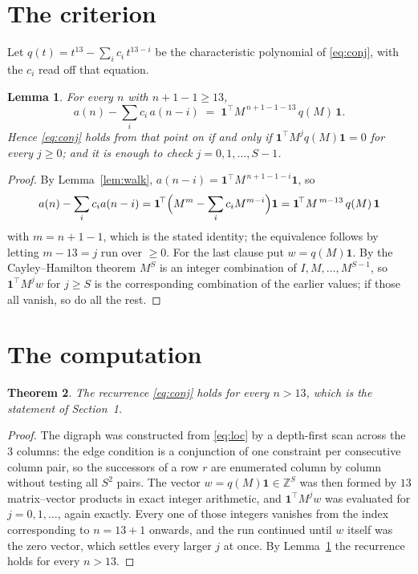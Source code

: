 \documentclass[11pt,a4paper]{article}
\theoremstyle{plain}
\newtheorem{theorem}{Theorem}
\newtheorem{lemma}[theorem]{Lemma}
\theoremstyle{definition}
\begin{document}
\section{The criterion}

Let $q(t)=t^{13}-\sum_i c_i\,t^{13-i}$ be the characteristic polynomial of
\eqref{eq:conj}, with the $c_i$ read off that equation.

\begin{lemma}\label{lem:crit}
For every $n$ with $n+1-1\ge13$,
\[
a(n)-\sum_i c_i\,a(n-i)\;=\;\mathbf{1}^{\!\top}M^{\,n+1-1-13}\,q(M)\,\mathbf{1} .
\]
Hence \eqref{eq:conj} holds from that point on if and only if
$\mathbf{1}^{\!\top}M^{j}q(M)\mathbf{1}=0$ for every $j\ge0$; and it is enough to check
$j=0,1,\dots,S-1$.
\end{lemma}

\begin{proof}
By Lemma~\ref{lem:walk}, $a(n-i)=\mathbf{1}^{\!\top}M^{\,n+1-1-i}\mathbf{1}$, so
\[
a(n)-\sum_i c_i a(n-i)
=\mathbf{1}^{\!\top}\Bigl(M^{m}-\sum_i c_i M^{m-i}\Bigr)\mathbf{1}
=\mathbf{1}^{\!\top}M^{\,m-13}\,q(M)\,\mathbf{1}
\]
with $m=n+1-1$, which is the stated identity; the equivalence follows by letting
$m-13=j$ run over $\ge0$. For the last clause put $w=q(M)\mathbf{1}$. By the
Cayley--Hamilton theorem $M^{S}$ is an integer combination of $I,M,\dots,M^{S-1}$, so
$\mathbf{1}^{\!\top}M^{j}w$ for $j\ge S$ is the corresponding combination of the earlier
values; if those all vanish, so do all the rest.
\end{proof}

\section{The computation}

\begin{theorem}
The recurrence \eqref{eq:conj} holds for every $n>13$, which is the statement of
Section~1.
\end{theorem}

\begin{proof}
The digraph was constructed from \eqref{eq:loc} by a depth-first scan across the $3$
columns: the edge condition is a conjunction of one constraint per consecutive column
pair, so the successors of a row $r$ are enumerated column by column without testing all
$S^2$ pairs. The vector $w=q(M)\mathbf{1}\in\mathbb{Z}^{S}$ was then formed by $13$
matrix--vector products in exact integer arithmetic, and $\mathbf{1}^{\!\top}M^{j}w$ was
evaluated for $j=0,1,\dots$, again exactly. Every one of those integers vanishes from the
index corresponding to $n=13+1$ onwards, and the run continued until $w$ itself was the
zero vector, which settles every larger $j$ at once. By Lemma~\ref{lem:crit} the recurrence
holds for every $n>13$.
\end{proof}
\end{document}
